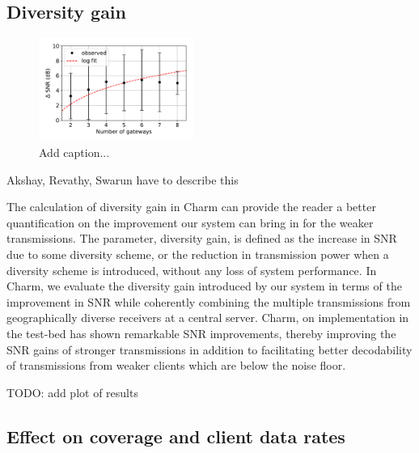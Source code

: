 \subsection{Diversity gain}
\label{sec:diversity-gain-eval}

\begin{figure}[!ht]
\centering
\includegraphics[width=0.45\textwidth]{figures/diversity_gain}
\caption{{\color{blue} Add caption...}}
\label{fig:diversity-gain}
\end{figure}

{\color{blue} Akshay, Revathy, Swarun have to describe this

{\color{violet}
The calculation of diversity gain in Charm can provide the reader a better quantification on the improvement our system can bring in for the weaker transmissions. The parameter, diversity gain, is defined as the increase in SNR due to some diversity scheme, or the reduction in transmission power when a diversity scheme is introduced, without any loss of system performance. In Charm, we evaluate the diversity gain introduced by our system in terms of the improvement in SNR while coherently combining the multiple transmissions from geographically diverse receivers at a central server. Charm, on implementation in the test-bed has shown remarkable SNR improvements, thereby improving the SNR gains of stronger transmissions in addition to facilitating better decodability of transmissions from weaker clients which are below the noise floor. 
}

TODO: add plot of results}


\subsection{Effect on coverage and client data rates}
\label{sec:coverage-data-rate-improvement}

